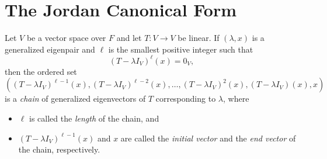 \section{The Jordan Canonical Form}
\begin{definition}
  Let $V$ be a vector space over $F$ and let $T: V \to V$ be linear.
  If $(\lambda, x)$ is a generalized eigenpair and $\ell$ is the smallest
  positive integer such that
  \begin{equation*}
    (T - \lambda I_V)^\ell(x) = 0_V,
  \end{equation*}
  then the ordered set
  \begin{equation*}
    ((T - \lambda I_V)^{\ell-1}(x),
     (T - \lambda I_V)^{\ell-2}(x),
     \dots,
     (T - \lambda I_V)^2(x),
     (T - \lambda I_V)(x),
     x)
  \end{equation*}
  is a \emph{chain} of generalized eigenvectors of $T$ corresponding to
  $\lambda$, where
  \begin{itemize}
    \item $\ell$ is called the \emph{length} of the chain, and
    \item $(T - \lambda I_V)^{\ell-1}(x)$ and $x$ are called the \emph{initial
    vector} and the \emph{end vector} of the chain, respectively.
  \end{itemize}
\end{definition}